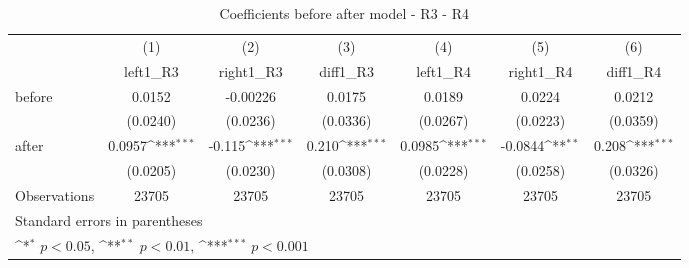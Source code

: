 \begin{table}[!ht]\centering \footnotesize
\def\sym#1{\ifmmode^{#1}\else\(^{#1}\)\fi}
\caption{Coefficients before after model - R3 - R4}
\begin{tabular}{l*{6}{c}}
\hline\hline
                    &\multicolumn{1}{c}{(1)}&\multicolumn{1}{c}{(2)}&\multicolumn{1}{c}{(3)}&\multicolumn{1}{c}{(4)}&\multicolumn{1}{c}{(5)}&\multicolumn{1}{c}{(6)}\\
                    &\multicolumn{1}{c}{left1\_R3}&\multicolumn{1}{c}{right1\_R3}&\multicolumn{1}{c}{diff1\_R3}&\multicolumn{1}{c}{left1\_R4}&\multicolumn{1}{c}{right1\_R4}&\multicolumn{1}{c}{diff1\_R4}\\
\hline
before              &      0.0152         &    -0.00226         &      0.0175         &      0.0189         &      0.0224         &      0.0212         \\
                    &    (0.0240)         &    (0.0236)         &    (0.0336)         &    (0.0267)         &    (0.0223)         &    (0.0359)         \\
[1em]
after               &      0.0957\sym{***}&      -0.115\sym{***}&       0.210\sym{***}&      0.0985\sym{***}&     -0.0844\sym{**} &       0.208\sym{***}\\
                    &    (0.0205)         &    (0.0230)         &    (0.0308)         &    (0.0228)         &    (0.0258)         &    (0.0326)         \\
\hline
Observations        &       23705         &       23705         &       23705         &       23705         &       23705         &       23705         \\
\hline\hline
\multicolumn{7}{l}{\footnotesize Standard errors in parentheses}\\
\multicolumn{7}{l}{\footnotesize \sym{*} \(p<0.05\), \sym{**} \(p<0.01\), \sym{***} \(p<0.001\)}\\
\end{tabular}
\end{table}
